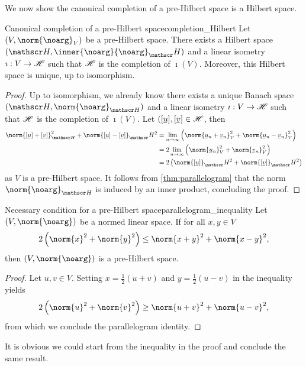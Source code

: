 We now show the canonical completion of a pre-Hilbert space is a Hilbert space.
\begin{proposition}{Canonical completion of a pre-Hilbert space}{completion_Hilbert}
    Let \((V, \norm{\noarg}_V)\) be a pre-Hilbert space. There exists a Hilbert space \((\hilbert, \inner{\noarg}{\noarg}_\hilbert)\) and a linear isometry \(\imath : V \to \mathscr{H}\) such that \(\mathscr{H}\) is the completion of \(\imath(V)\). Moreover, this Hilbert space is unique, up to isomorphism.
\end{proposition}
\begin{proof}
    Up to isomorphism, we already know there exists a unique Banach space \((\hilbert, \norm{\noarg}_{\hilbert})\) and a linear isometry \(\imath : V \to \mathscr{H}\) such that \(\mathscr{H}\) is the completion of \(\imath(V)\). Let \(([\sequnder{u}], [\sequnder{v}] \in \hilbert\), then
    \begin{align*}
        \norm{[\sequnder{u}]+[\sequnder{v}]}_{\hilbert}^2 + \norm{[\sequnder{u}]-[\sequnder{v}]}_\hilbert^2 
        &= \lim_{n\to\infty}{\left(\norm{\sequnder{u}_n + \sequnder{v}_n}_V^2 + \norm{\sequnder{u}_n - \sequnder{v}_n}_V^2\right)}\\
        &= 2\lim_{n\to\infty}{\left(\norm{\sequnder{u}_n}_{V}^2 + \norm{\sequnder{v}_n}_{V}^2\right)}\\
        &= 2\left(\norm{[\sequnder{u}]}_\hilbert^2 + \norm{[\sequnder{v}]}_\hilbert^2\right)
    \end{align*}
    as \(V\) is a pre-Hilbert space. It follows from \cref{thm:parallelogram} that the norm \(\norm{\noarg}_{\hilbert}\) is induced by an inner product, concluding the proof.
\end{proof}

\begin{lemma}{Necessary condition for a pre-Hilbert space}{parallelogram_inequality}
    Let \((V, \norm{\noarg})\) be a normed linear space. If for all \(x,y \in V\)
    \begin{equation*}
        2\left(\norm{x}^2 + \norm{y}^2\right) \leq \norm{x+y}^2 + \norm{x - y}^2,
    \end{equation*}
    then \((V, \norm{\noarg})\) is a pre-Hilbert space.
\end{lemma}
\begin{proof}
    Let \(u, v \in V\). Setting \(x = \frac12(u + v)\) and \(y = \frac12(u - v)\) in the inequality yields
    \begin{equation*}
        2\left(\norm{u}^2 + \norm{v}^2\right) \geq \norm{u+v}^2 + \norm{u - v}^2,
    \end{equation*}
    from which we conclude the parallelogram identity.
\end{proof}
\begin{remark}
    It is obvious we could start from the inequality in the proof and conclude the same result.
\end{remark}

